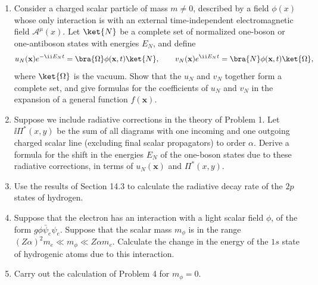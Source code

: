 

\begin{enumerate}
\item Consider a charged scalar particle of mass $m\ne0$, described by a
field $\phi(x)$ whose only interaction is with an external time-independent
electromagnetic field $\mathcal{A}^{\mu}(x)$. Let $\ket{N}$ be a complete set
of normalized one-boson or one-antiboson states with energies $E_N$, and
define
\[
 u_N(\mathbf{x})e^{-\ii E_Nt}
   =\bra{\Omega}\phi(\mathbf{x},t)\ket{N},
 \qquad
 v_N(\mathbf{x})e^{\ii E_Nt}
   =\bra{N}\phi(\mathbf{x},t)\ket{\Omega},
\]
where $\ket{\Omega}$ is the vacuum. Show that the $u_N$ and $v_N$ together
form a complete set, and give formulas for the coefficients of $u_N$ and
$v_N$ in the expansion of a general function $f(\mathbf{x})$.

\item Suppose we include radiative corrections in the theory of Problem 1.
Let $\ii\Pi^*(x,y)$ be the sum of all diagrams with one incoming and one
outgoing charged scalar line (excluding final scalar propagators) to order
$\alpha$. Derive a formula for the shift in the energies $E_N$ of the
one-boson states due to these radiative corrections, in terms of
$u_N(\mathbf{x})$ and $\Pi^*(x,y)$.

\item Use the results of Section 14.3 to calculate the radiative decay rate
of the $2p$ states of hydrogen.

\item Suppose that the electron has an interaction with a light scalar field
$\phi$, of the form $g\phi\bar\psi_e\psi_e$. Suppose that the scalar mass
$m_\phi$ is in the range
$(Z\alpha)^2m_e\ll m_\phi\ll Z\alpha m_e$. Calculate the change in the
energy of the $1s$ state of hydrogenic atoms due to this interaction.

\item Carry out the calculation of Problem 4 for $m_\phi=0$.
\end{enumerate}


